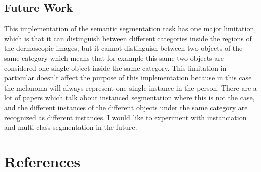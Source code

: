 \subsection{Future Work}
This implementation of the semantic segmentation task has one major limitation, which is that it can distinguish between different categories inside the regions of the dermoscopic images, but it cannot distinguish between two objects of the same category which means that for example this same two objects are considered one single object inside the same category. This limitation in particular doesn't affect the purpose of this implementation because in this case the melanoma will always represent one single instance in the person. There are a lot of papers which talk about instanced segmentation where this is not the case, and the different instances of the different objects under the same category are recognized as different instances. I would like to experiment with instanciation and multi-class segmentation in the future. 



%
%
\section{References}


\renewcommand\refname{\vskip -1cm}

\footnotesize

%
%



